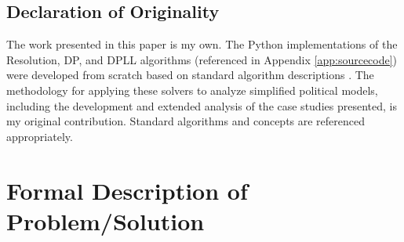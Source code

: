 \documentclass[11pt, a4paper]{article}
\begin{document}
\subsection*{Declaration of Originality}
The work presented in this paper is my own. The Python implementations of the Resolution, DP, and DPLL algorithms (referenced in Appendix \ref{app:sourcecode}) were developed from scratch based on standard algorithm descriptions \cite{Robinson1965, DavisPutnam1960, DPLL1962}. The methodology for applying these solvers to analyze simplified political models, including the development and extended analysis of the case studies presented, is my original contribution. Standard algorithms and concepts are referenced appropriately.

\section{Formal Description of Problem/Solution} \label{sec:formal}
\end{document}

